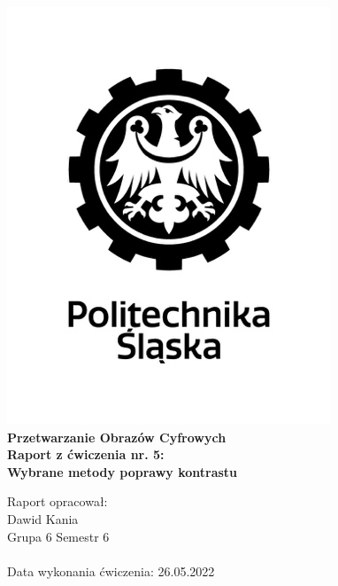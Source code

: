 
\begin{titlepage}
    \begin{center}
        \includegraphics[width=.50\linewidth]{other/polsl.png}\\
        \Huge
        \textbf{Przetwarzanie Obrazów Cyfrowych}
        \\ \vspace{1.5cm}
        \Large
        \textbf{Raport z ćwiczenia nr. 5: } \\
        \textbf{Wybrane metody poprawy kontrastu}       
    \end{center}
    \vspace{3.0cm}
    \Large
    Raport opracował: \\
    Dawid Kania \\
    Grupa 6 Semestr 6 \\ \\
    Data wykonania ćwiczenia: 26.05.2022
\end{titlepage}

